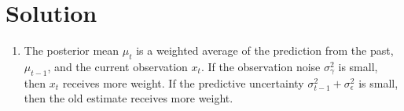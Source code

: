 \documentclass[submit]{harvardml}
\newcommand{\sigeps}{\sigma_{\epsilon}}
\newcommand{\siggam}{\sigma_{\gamma}}
\newenvironment{solution}
  {\color{blue}\section*{Solution}}
{}
\begin{document}
\begin{solution}
\begin{enumerate}
\begin{enumerate}
        \item From parts (b) and (c),
        \[
        p(z_t\mid x_0,\ldots,x_t)
        \propto
        N(x_t;z_t,\siggam^2)N(z_t;\bar{\mu}_t,\bar{\sigma}_t^2).
        \]
        Rewriting the first term as a density in $z_t$,
        \[
        N(x_t;z_t,\siggam^2)=N(z_t;x_t,\siggam^2),
        \]
        so
        \[
        p(z_t\mid x_0,\ldots,x_t)
        \propto
        N(z_t;x_t,\siggam^2)N(z_t;\bar{\mu}_t,\bar{\sigma}_t^2).
        \]
        The product of two Gaussians in the same variable is proportional to another Gaussian. Therefore,
        \[
        p(z_t\mid x_0,\ldots,x_t)=N(z_t;\mu_t,\sigma_t^2),
        \]
        where
        \[
        \sigma_t^2
        =\left(\frac{1}{\bar{\sigma}_t^2}+\frac{1}{\siggam^2}\right)^{-1}
        =\frac{\bar{\sigma}_t^2\siggam^2}{\bar{\sigma}_t^2+\siggam^2},
        \]
        and
        \[
        \mu_t
        =\frac{\siggam^2}{\bar{\sigma}_t^2+\siggam^2}\bar{\mu}_t
        +\frac{\bar{\sigma}_t^2}{\bar{\sigma}_t^2+\siggam^2}x_t.
        \]
        Substituting $\bar{\mu}_t=\mu_{t-1}$ and $\bar{\sigma}_t^2=\sigma_{t-1}^2+\sigeps^2$ gives
        \[
        \mu_t
        =\frac{\siggam^2}{\sigma_{t-1}^2+\sigeps^2+\siggam^2}\mu_{t-1}
        +\frac{\sigma_{t-1}^2+\sigeps^2}{\sigma_{t-1}^2+\sigeps^2+\siggam^2}x_t,
        \]
        and
        \[
        \sigma_t^2
        =\frac{(\sigma_{t-1}^2+\sigeps^2)\siggam^2}{\sigma_{t-1}^2+\sigeps^2+\siggam^2}.
        \]
    \end{enumerate}

    \item The posterior mean $\mu_t$ is a weighted average of the prediction from the past, $\mu_{t-1}$, and the current observation $x_t$. If the observation noise $\siggam^2$ is small, then $x_t$ receives more weight. If the predictive uncertainty $\sigma_{t-1}^2+\sigeps^2$ is small, then the old estimate receives more weight.
\end{enumerate}

\end{solution}

\newpage
\end{document}

